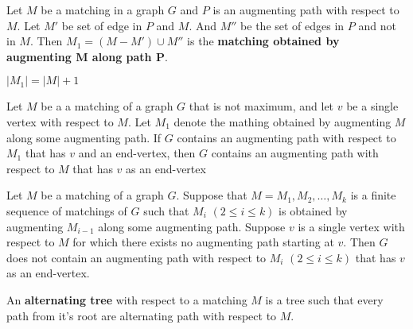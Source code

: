\begin{definition}
	Let $M$ be a matching in a graph $G$ and $P$ is an augmenting path with respect to $M$.
	Let $M'$ be set of edge in $P$ and $M$.
	And $M''$ be the set of edges in $P$ and not in $M$.
	Then $M_1 = (M-M') \cup M''$ is the \textbf{matching obtained by augmenting M along path P}.
\end{definition}

\begin{remark}
	$|M_1| = |M|+1$
\end{remark}

\begin{theorem}
	Let $M$ be a a matching of a graph $G$ that is not maximum, and let $v$ be a single vertex with respect to $M$.
	Let $M_1$ denote the mathing obtained by augmenting $M$ along some augmenting path.
	If $G$ contains an augmenting path with respect to $M_1$ that has $v$ and an end-vertex, then $G$ contains an augmenting path with respect to $M$ that has $v$ as an end-vertex
\end{theorem}
\begin{corollary}
	Let $M$ be a matching of a graph $G$.
	Suppose that $M = M_1,M_2,\dots,M_k$ is a finite sequence of matchings of $G$ such that $M_i$ $(2 \le i \le k)$ is obtained by augmenting $M_{i-1}$ along some augmenting path.
	Suppose $v$ is a single vertex with respect to $M$ for which there exists no augmenting path starting at $v$.
	Then $G$ does not contain an augmenting path with respect to $M_i$ $(2 \le i \le k)$ that has $v$ as an end-vertex.
\end{corollary}

\begin{definition}
	An \textbf{alternating tree} with respect to a matching $M$ is a tree such that every path from it's root are alternating path with respect to $M$.
\end{definition}

